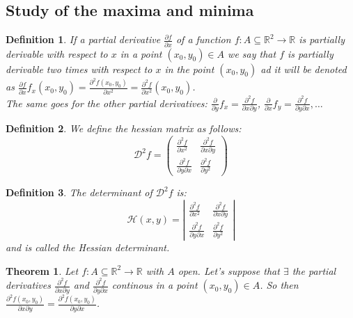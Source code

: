 \documentclass{article}
\newtheorem{theorem}{Theorem}
\newtheorem{definition}{Definition}
\begin{document}
    \subsection*{Study of the maxima and minima}
        \begin{definition}
            If a partial derivative $\frac{\partial f}{\partial x}$ of a function $f : A \subseteq \mathbb{R}^2 \rightarrow \mathbb{R}$ is partially derivable with respect to $x$ in a point $(x_0,y_0) \in A$ we say that $f$ is partially derivable two times with respect to $x$ in the point $(x_0,y_0)$ ad it will be denoted as $\frac{\partial f}{\partial x}f_x(x_0,y_0)=\frac{\partial^2 f(x_0,y_0)}{\partial x^2} = \frac{\partial^2 f}{\partial x^2}(x_0,y_0)$. \\
            The same goes for the other partial derivatives: $\frac{\partial}{\partial y}f_x = \frac{\partial^2 f}{\partial x \partial y}$, $\frac{\partial}{\partial x}f_y = \frac{\partial^2 f}{\partial y \partial x}, \ldots $            
        \end{definition}
        \begin{definition}
            We define the hessian matrix as follows:
        \begin{equation*}
            \mathcal{D}^2f = \left(\begin{matrix}
                \frac{\partial^2 f}{\partial x^2} & \frac{\partial ^2 f}{\partial x \partial y} \\ \frac{\partial^2 f}{\partial y \partial x} & \frac{\partial ^2 f}{\partial y^2} 
            \end{matrix} \right)  
        \end{equation*}
        \end{definition}
        \begin{definition}
            The determinant of $\mathcal{D}^2f$ is: 
            \begin{equation*}
                \mathcal{H}(x,y) = \left\lvert \begin{matrix}
                \frac{\partial^2 f}{\partial x^2} & \frac{\partial ^2 f}{\partial x \partial y} \\ \frac{\partial^2 f}{\partial y \partial x} & \frac{\partial ^2 f}{\partial y^2} 
            \end{matrix} \right\rvert 
        \end{equation*} and is called the Hessian determinant.
        \end{definition}
        \begin{theorem}
            Let $f : A \subseteq \mathbb{R}^2 \rightarrow \mathbb{R}$ with $A$ open. Let's suppose that $\exists$ the partial derivatives $\frac{\partial^2 f}{\partial x \partial y}$ and $\frac{\partial^2 f}{\partial y \partial x}$ continous in a point $(x_0,y_0) \in A$. So then $\frac{\partial^2 f (x_0,y_0)}{\partial x \partial y} = \frac{\partial^2 f (x_0,y_0)}{\partial y \partial x}$.
        \end{theorem}
\end{document}

